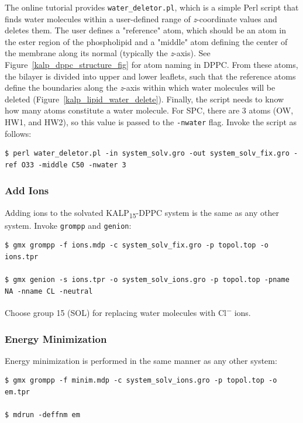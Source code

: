 \documentclass[9pt,tutorial,pubversion]{livecoms}
\begin{document}
The online tutorial provides \texttt{water\_deletor.pl}, which is a simple Perl script that finds water molecules within a user-defined range of {\em z}-coordinate values and deletes them. The user defines a "reference" atom, which should be an atom in the ester region of the phospholipid and a "middle" atom defining the center of the membrane along its normal (typically the {\em z}-axis). See Figure~\ref{kalp_dppc_structure_fig} for atom naming in DPPC. From these atoms, the bilayer is divided into upper and lower leaflets, such that the reference atoms define the boundaries along the {\em z}-axis within which water molecules will be deleted (Figure~\ref{kalp_lipid_water_delete}). Finally, the script needs to know how many atoms constitute a water molecule. For SPC, there are 3 atoms (OW, HW1, and HW2), so this value is passed to the \texttt{-nwater} flag. Invoke the script as follows:

\begin{lstlisting}
$ perl water_deletor.pl -in system_solv.gro -out system_solv_fix.gro -ref O33 -middle C50 -nwater 3
\end{lstlisting}

\subsubsection{Add Ions} \label{kalp_ions}

Adding ions to the solvated KALP\textsubscript{15}-DPPC system is the same as any other system. Invoke \texttt{grompp} and \texttt{genion}:

\begin{lstlisting}
$ gmx grompp -f ions.mdp -c system_solv_fix.gro -p topol.top -o ions.tpr

$ gmx genion -s ions.tpr -o system_solv_ions.gro -p topol.top -pname NA -nname CL -neutral
\end{lstlisting}

Choose group 15 (SOL) for replacing water molecules with Cl\textsuperscript{$-$} ions.

\subsubsection{Energy Minimization} \label{kalp_em}

Energy minimization is performed in the same manner as any other system:

\begin{lstlisting}
$ gmx grompp -f minim.mdp -c system_solv_ions.gro -p topol.top -o em.tpr

$ mdrun -deffnm em
\end{lstlisting}
\end{document}
